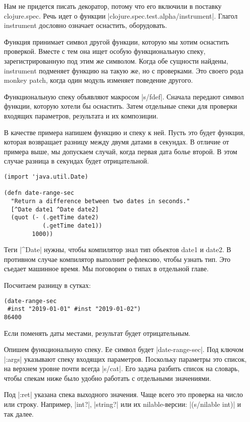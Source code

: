 Нам не придется писать декоратор, потому что его включили в поставку
clojure.spec. Речь идет о функции \spverb|clojure.spec.test.alpha/instrument|. Глагол
instrument дословно означает оснастить, оборудовать.

Функция принимает символ другой функции, которую мы хотим оснастить
проверкой. Вместе с тем она ищет особую функциональную спеку, зарегистрированную
под этим же символом. Когда обе сущности найдены, instrument подменяет функцию
на такую же, но с проверками. Это своего рода monkey patch, когда один модуль
изменяет поведение другого.

Функциональную спеку объявляют макросом \spverb|s/fdef|. Сначала передают символ
функции, которую хотели бы оснастить. Затем отдельные спеки для проверки
входящих параметров, результата и их композиции.

В качестве примера напишем функцию и спеку к ней. Пусть это будет функция,
которая возвращает разницу между двумя датами в секундах. В отличие от примера
выше, мы допускаем случай, когда первая дата болье второй. В этом случае разница
в секундах будет отрицательной.

\begin{verbatim}
(import 'java.util.Date)

(defn date-range-sec
  "Return a difference between two dates in seconds."
  [^Date date1 ^Date date2]
  (quot (- (.getTime date2)
           (.getTime date1))
        1000))
\end{verbatim}

Теги \spverb|^Date| нужны, чтобы компилятор знал тип объектов date1 и date2. В
противном случае компилятор выполнит рефлексию, чтобы узнать тип. Это съедает
машинное время. Мы поговорим о типах в отдельной главе.

Посчитаем разницу в сутках:

\begin{verbatim}
(date-range-sec
 #inst "2019-01-01" #inst "2019-01-02")
86400
\end{verbatim}

Если поменять даты местами, результат будет отрицательным.

Опишем функциональную спеку. Ее символ будет \spverb|date-range-sec|.  Под ключом
\spverb|:args| указывают спеку входящих параметров. Поскольку параметры это список, на
верхнем уровне почти всегда \spverb|s/cat|. Его задача разбить список на словарь, чтобы
спекам ниже было удобно работать с отдельными значениями.

Под \spverb|:ret| указана спека выходного значения. Чаще всего это проверка на число
или строку. Например, \spverb|int?|, \spverb|string?| или их nilable-версии: \spverb|(s/nilable int)|
и так далее.

